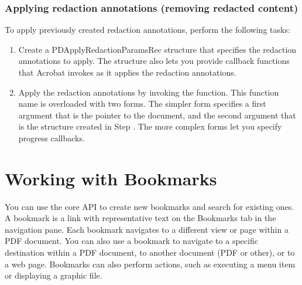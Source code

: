 \documentclass[letterpaper,12pt,english,openany,oneside]{sphinxmanual}
\begin{document}
\subsection{Applying redaction annotations (removing redacted content)}
\label{\detokenize{Plugins_Annotations:applying-redaction-annotations-removing-redacted-content}}
To apply previously created redaction annotations, perform the following tasks:
\begin{enumerate}
%
\item {} 
Create a PDApplyRedactionParamsRec structure that specifies the redaction annotations to apply. The structure also lets you provide callback functions that Acrobat invokes as it applies the redaction annotations.

\item {} 
Apply the redaction annotations by invoking the  function. This function name is overloaded with two forms. The simpler form specifies a first argument that is the pointer to the document, and the second argument that is the structure created in Step . The more complex forms let you specify progress callbacks.

\end{enumerate}


\chapter{Working with Bookmarks}
\label{\detokenize{Plugins_Bookmark:working-with-bookmarks}}\label{\detokenize{Plugins_Bookmark::doc}}
You can use the core API to create new bookmarks and search for existing ones. A bookmark is a link with representative text on the Bookmarks tab in the navigation pane. Each bookmark navigates to a different view or page within a PDF document. You can also use a bookmark to navigate to a specific destination within a PDF document, to another document (PDF or other), or to a web page. Bookmarks can also perform actions, such as executing a menu item or displaying a graphic file.
\end{document}
